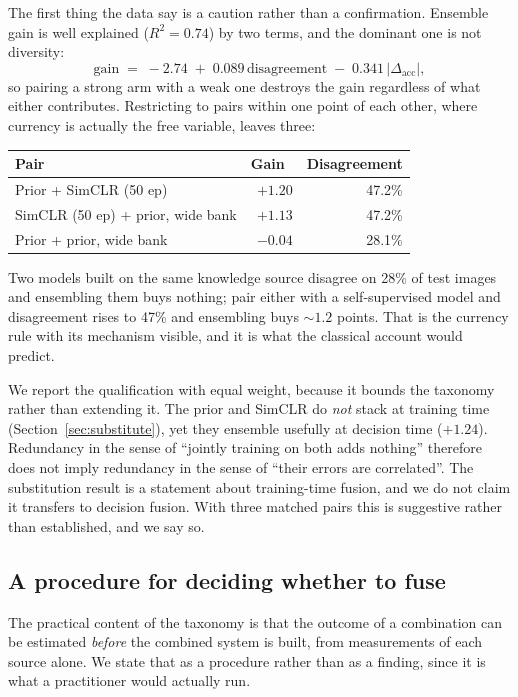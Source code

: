 The first thing the data say is a caution rather than a confirmation.
Ensemble gain is well explained ($R^2 = 0.74$) by two terms, and the
dominant one is not diversity:
\begin{equation}
  \mathrm{gain} \;=\; -2.74 \;+\; 0.089\,\mathrm{disagreement}
                       \;-\; 0.341\,|\Delta_{\mathrm{acc}}|,
  \label{eq:ensgain}
\end{equation}
so pairing a strong arm with a weak one destroys the gain regardless of
what either contributes. Restricting to pairs within one point of each
other, where currency is actually the free variable, leaves three:

\begin{center}\scriptsize
\begin{tabular}{@{}P{0.34\columnwidth}rr@{}}
\toprule
Pair & Gain~\up & Disagreement \\
\midrule
Prior + SimCLR (50 ep) & $+1.20$ & 47.2\% \\
SimCLR (50 ep) + prior, wide bank & $+1.13$ & 47.2\% \\
Prior + prior, wide bank & $-0.04$ & 28.1\% \\
\bottomrule
\end{tabular}
\end{center}

Two models built on the same knowledge source disagree on 28\% of test
images and ensembling them buys nothing; pair either with a
self-supervised model and disagreement rises to 47\% and ensembling buys
${\sim}1.2$ points. That is the currency rule with its mechanism visible,
and it is what the classical account would predict.

We report the qualification with equal weight, because it bounds the
taxonomy rather than extending it. The prior and SimCLR do \emph{not} stack
at training time (Section~\ref{sec:substitute}), yet they ensemble usefully
at decision time ($+1.24$). Redundancy in the sense of ``jointly training on
both adds nothing'' therefore does not imply redundancy in the sense of
``their errors are correlated''. The substitution result is a statement
about training-time fusion, and we do not claim it transfers to decision
fusion. With three matched pairs this is suggestive rather than
established, and we say so.

\subsection{A procedure for deciding whether to fuse}\label{sec:procedure}
The practical content of the taxonomy is that the outcome of a combination
can be estimated \emph{before} the combined system is built, from
measurements of each source alone. We state that as a procedure rather than
as a finding, since it is what a practitioner would actually run.

